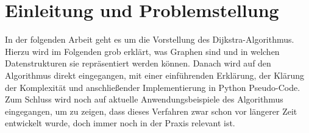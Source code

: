 \chapter{Einleitung und Problemstellung}

In der folgenden Arbeit geht es um die Vorstellung des Dijkstra-Algorithmus.
Hierzu wird im Folgenden grob erklärt, was Graphen sind und in welchen Datenstrukturen sie repräsentiert werden können.
Danach wird auf den Algorithmus direkt eingegangen, mit einer einführenden Erklärung, der Klärung der Komplexität und anschließender Implementierung in Python Pseudo-Code.
Zum Schluss wird noch auf aktuelle Anwendungsbeispiele des Algorithmus eingegangen, um zu zeigen, dass dieses Verfahren zwar schon vor längerer Zeit entwickelt wurde, doch immer noch in der Praxis relevant ist.
